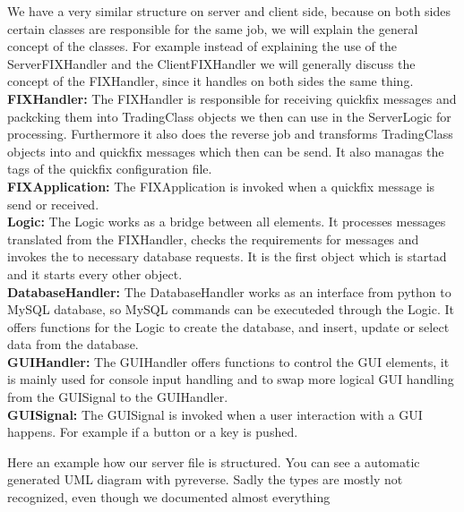 \documentclass[a4paper, 11pt]{article}
\begin{document}
We have a very similar structure on server and client side, because on both sides certain classes are responsible for the same job,
we will explain the general concept of the classes. For example instead of explaining the use of the ServerFIXHandler and the ClientFIXHandler
we will generally discuss the concept of the FIXHandler, since it handles on both sides the same thing.\\
\textbf{FIXHandler:} The FIXHandler is responsible for receiving quickfix messages and packcking them into TradingClass objects 
we then can use in the ServerLogic for processing. Furthermore it also does the reverse job and transforms TradingClass objects into
and quickfix messages which then can be send. It also managas the tags of the quickfix configuration file. \\
\textbf{FIXApplication:} The FIXApplication is invoked when a quickfix message is send or received. \\
\textbf{Logic:} The Logic works as a bridge between all elements. It processes messages translated from the FIXHandler, checks the 
requirements for messages and invokes the to necessary database requests. It is the first object which is startad and it starts every other object. \\
\textbf{DatabaseHandler:} The DatabaseHandler works as an interface from python to MySQL database, so MySQL commands can be executeded through
the Logic. It offers functions for the Logic to create the database, and insert, update or select data from the database. \\
\textbf{GUIHandler:} The GUIHandler offers functions to control the GUI elements, it is mainly used for console input handling and to swap more
logical GUI handling from the GUISignal to the GUIHandler. \\
\textbf{GUISignal:} The GUISignal is invoked when a user interaction with a GUI happens. For example if a button or a key is pushed. 

Here an example how our server file is structured. You can see a automatic generated UML diagram with pyreverse. Sadly
the types are mostly not recognized, even though we documented almost everything
\end{document}
